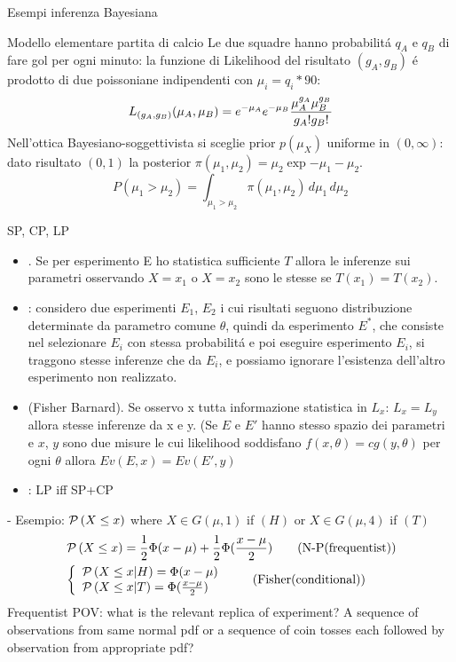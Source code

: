 \documentclass[asd-beamer.tex]{subfiles}%
\begin{document}
\begin{wordonframe}{Esempi inferenza Bayesiana}
\begin{block}{Modello elementare partita di calcio}
	Le due squadre hanno probabilit\'a $q_A$ e $q_B$ di fare gol per ogni minuto: la funzione di Likelihood del risultato $(g_A,g_B)$ \'e prodotto di due poissoniane indipendenti con $\mu_i=q_i*90$:
	\[L_{(g_A,g_B)}(\mu_A,\mu_B)=e^{-\mu_A}e^{-\mu_B}\frac{\mu_A^{g_A}\mu_B^{g_B}}{g_A!g_B!}\]
	Nell'ottica Bayesiano-soggettivista si sceglie prior $p(\mu_X)$ uniforme in $(0,\infty)$: dato risultato $(0,1)$ la posterior $\pi(\mu_1,\mu_2)=\mu_2\exp{-\mu_1-\mu_2}$.
	\[P(\mu_1>\mu_2)=\int_{\mu_1>\mu_2}\pi(\mu_1,\mu_2)\,d\mu_1\,d\mu_2\]
\end{block}
\end{wordonframe}

\begin{frame}[allowframebreaks]{SP, CP, LP}
	\begin{itemize}
	\item {}. Se per esperimento E ho statistica sufficiente $T$ allora le inferenze sui parametri osservando $X=x_1$ o $X=x_2$ sono le stesse se $T(x_1)=T(x_2)$.
	\item {}: considero due esperimenti $E_1$, $E_2$ i cui risultati seguono distribuzione determinate da parametro comune $\theta$, quindi da esperimento $E^*$, che consiste nel selezionare $E_i$ con stessa probabilit\'a e poi eseguire esperimento $E_i$, si traggono stesse inferenze che da $E_i$, e possiamo ignorare l'esistenza dell'altro esperimento non realizzato.
	\item {} (Fisher Barnard). Se osservo x tutta informazione statistica in $L_x$: $L_x=L_y$ allora stesse inferenze da x e y. (Se $E$ e $E'$ hanno stesso spazio dei parametri e $x$, $y$ sono due misure le cui likelihood soddisfano $f(x,\theta)=cg(y,\theta)$ per ogni $\theta$ allora $Ev(E,x)=Ev(E',y)$
	\item {}: LP iff SP+CP
	\end{itemize}
     - Esempio: $\operatorname{\mathcal{P}}{(X\leq x)}$ where $X\in G(\mu,1)$ if $(H)$ or $X\in G(\mu,4)$ if $(T)$
    \begin{align*}
        &\operatorname{\mathcal{P}}{(X\leq x)}=\frac{1}{2}\Phi{(x-\mu)}+\frac{1}{2}\Phi(\frac{x-\mu}{2})\tag{N-P(frequentist)}\\
        &\left\{\begin{array}{l}\operatorname{\mathcal{P}}{(X\leq x|H)}=\Phi(x-\mu)\\\operatorname{\mathcal{P}}{(X\leq x|T)}=\Phi(\frac{x-\mu}{2})\\ \end{array}\right.\tag{Fisher(conditional)}
    \end{align*}
Frequentist POV: what is the relevant replica of experiment? A sequence of observations from same normal pdf or a sequence of coin tosses each followed by observation from appropriate pdf?
\end{frame}
\end{document}
